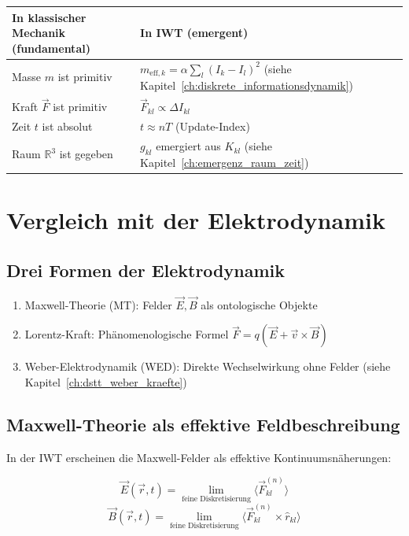 \begin{tabular}{|l|l|}
\hline
\textbf{In klassischer Mechanik (fundamental)} & \textbf{In IWT (emergent)} \\
\hline
Masse \( m \) ist primitiv & \( m_{\text{eff},k} = \alpha \sum_l (I_k - I_l)^2 \) (siehe Kapitel~\ref{ch:diskrete_informationsdynamik}) \\
Kraft \( \vec{F} \) ist primitiv & \( \vec{F}_{kl} \propto \Delta I_{kl} \) \\
Zeit \( t \) ist absolut & \( t \approx nT \) (Update-Index) \\
Raum \( \mathbb{R}^3 \) ist gegeben & \( g_{kl} \) emergiert aus \( K_{kl} \) (siehe Kapitel~\ref{ch:emergenz_raum_zeit}) \\
\hline
\end{tabular}

\section{Vergleich mit der Elektrodynamik}
\label{app:vergleich_elektrodynamik}

\subsection{Drei Formen der Elektrodynamik}
\label{sub:vergleich_elektro_formen}

\begin{enumerate}
    \item Maxwell-Theorie (MT): Felder \( \vec{E}, \vec{B} \) als ontologische Objekte
    \item Lorentz-Kraft: Phänomenologische Formel \( \vec{F} = q(\vec{E} + \vec{v} \times \vec{B}) \)
    \item Weber-Elektrodynamik (WED): Direkte Wechselwirkung ohne Felder (siehe Kapitel~\ref{ch:dstt_weber_kraefte})
\end{enumerate}

\subsection{Maxwell-Theorie als effektive Feldbeschreibung}
\label{sub:vergleich_elektro_maxwell}

In der IWT erscheinen die Maxwell-Felder als effektive Kontinuumsnäherungen:

\[
\vec{E}(\vec{r}, t) = \lim_{\text{feine Diskretisierung}} \langle \vec{F}_{kl}^{(n)} \rangle
\]
\[
\vec{B}(\vec{r}, t) = \lim_{\text{feine Diskretisierung}} \langle \vec{F}_{kl}^{(n)} \times \hat{r}_{kl} \rangle
\]

